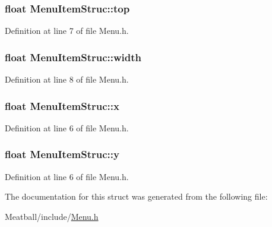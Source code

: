 \hypertarget{struct_menu_item_struc_a4b9b11a43fdec82463e1f4eee9eb5a20}{
\subsubsection[{top}]{\setlength{\rightskip}{0pt plus 5cm}float Menu\-Item\-Struc\-::top}}\label{struct_menu_item_struc_a4b9b11a43fdec82463e1f4eee9eb5a20}


Definition at line 7 of file Menu.\-h.

\hypertarget{struct_menu_item_struc_a22efb659c4cc71c564e26858e3c9a4c6}{
\subsubsection[{width}]{\setlength{\rightskip}{0pt plus 5cm}float Menu\-Item\-Struc\-::width}}\label{struct_menu_item_struc_a22efb659c4cc71c564e26858e3c9a4c6}


Definition at line 8 of file Menu.\-h.

\hypertarget{struct_menu_item_struc_a1835197fea1ec66488b3df6ec9c398da}{
\subsubsection[{x}]{\setlength{\rightskip}{0pt plus 5cm}float Menu\-Item\-Struc\-::x}}\label{struct_menu_item_struc_a1835197fea1ec66488b3df6ec9c398da}


Definition at line 6 of file Menu.\-h.

\hypertarget{struct_menu_item_struc_abb8b4c3d8474a2938defd2cdbea74fa2}{
\subsubsection[{y}]{\setlength{\rightskip}{0pt plus 5cm}float Menu\-Item\-Struc\-::y}}\label{struct_menu_item_struc_abb8b4c3d8474a2938defd2cdbea74fa2}


Definition at line 6 of file Menu.\-h.



The documentation for this struct was generated from the following file\-:\begin{DoxyCompactItemize}
\item 
Meatball/include/\hyperlink{_menu_8h}{Menu.\-h}\end{DoxyCompactItemize}
